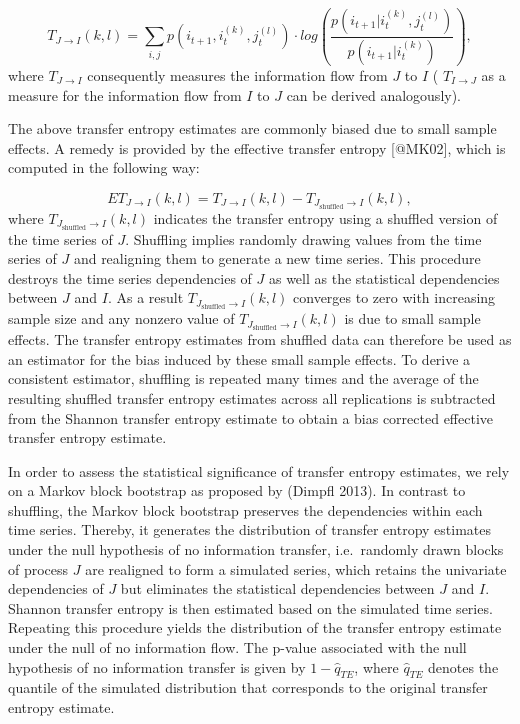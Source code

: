 \documentclass[
]{article}
\begin{document}
\[
  T_{J \rightarrow I}(k,l) = \sum_{i,j} p\left(i_{t+1}, i_t^{(k)}, j_t^{(l)}\right) \cdot log \left(\frac{p\left(i_{t+1}| i_t^{(k)}, j_t^{(l)}\right)}{p\left(i_{t+1}|i_t^{(k)}\right)}\right),
\] where \(T_{J\rightarrow I}\) consequently measures the information
flow from \(J\) to \(I\) ( \(T_{I \rightarrow J}\) as a measure for the
information flow from \(I\) to \(J\) can be derived analogously).

The above transfer entropy estimates are commonly biased due to small
sample effects. A remedy is provided by the effective transfer entropy
{[}@MK02{]}, which is computed in the following way:

\[
  ET_{J \rightarrow I}(k,l)=  T_{J \rightarrow I}(k,l)- T_{J_{\text{shuffled}} \rightarrow I}(k,l),
\] where \(T_{J_{\text{shuffled}} \rightarrow I}(k,l)\) indicates the
transfer entropy using a shuffled version of the time series of \(J\).
Shuffling implies randomly drawing values from the time series of \(J\)
and realigning them to generate a new time series. This procedure
destroys the time series dependencies of \(J\) as well as the
statistical dependencies between \(J\) and \(I\). As a result
\(T_{J_{\text{shuffled}} \rightarrow I}(k,l)\) converges to zero with
increasing sample size and any nonzero value of
\(T_{J_{\text{shuffled}} \rightarrow I}(k,l)\) is due to small sample
effects. The transfer entropy estimates from shuffled data can therefore
be used as an estimator for the bias induced by these small sample
effects. To derive a consistent estimator, shuffling is repeated many
times and the average of the resulting shuffled transfer entropy
estimates across all replications is subtracted from the Shannon
transfer entropy estimate to obtain a bias corrected effective transfer
entropy estimate.

In order to assess the statistical significance of transfer entropy
estimates, we rely on a Markov block bootstrap as proposed by (Dimpfl
2013). In contrast to shuffling, the Markov block bootstrap preserves
the dependencies within each time series. Thereby, it generates the
distribution of transfer entropy estimates under the null hypothesis of
no information transfer, i.e.~randomly drawn blocks of process \(J\) are
realigned to form a simulated series, which retains the univariate
dependencies of \(J\) but eliminates the statistical dependencies
between \(J\) and \(I\). Shannon transfer entropy is then estimated
based on the simulated time series. Repeating this procedure yields the
distribution of the transfer entropy estimate under the null of no
information flow. The p-value associated with the null hypothesis of no
information transfer is given by \(1-\hat{q}_{TE}\), where
\(\hat{q}_{TE}\) denotes the quantile of the simulated distribution that
corresponds to the original transfer entropy estimate.
\end{document}
